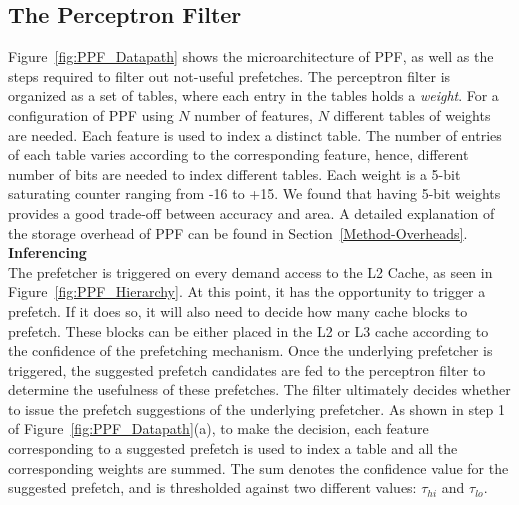 \subsection{The Perceptron Filter}
\label{Arch-Perceptron}

Figure~\ref{fig:PPF_Datapath} shows the microarchitecture of PPF, as
well as the steps required to filter out not-useful prefetches. The
perceptron filter is organized as a set of tables, where each entry in
the tables holds a \textit{weight}.  For a configuration of PPF using
$N$ number of features, $N$ different tables of weights are needed.
Each feature is used to index a distinct table. The number of entries
of each table varies according to the corresponding feature, hence,
different number of bits are needed to index different tables. Each
weight is a 5-bit saturating counter ranging from -16 to +15. We found
that having 5-bit weights provides a good trade-off between accuracy
and area. A detailed explanation of the storage overhead of PPF can
be found in Section~\ref{Method-Overheads}.
%
%
\newline
\newline
\noindent \textbf{Inferencing}\\
The {prefetcher} is triggered on every demand access to the L2
Cache, as seen in Figure~\ref{fig:PPF_Hierarchy}.  At this point, 
it has the opportunity to trigger a prefetch.
If it does so, it will also need to decide how many cache blocks to
prefetch.  These blocks can be either placed in the L2 or L3 cache
according to the confidence of the prefetching mechanism.  Once the
{underlying} prefetcher is triggered, the suggested prefetch candidates are
fed to the perceptron filter to determine the usefulness of these
prefetches. The filter ultimately decides whether to issue the
prefetch suggestions of the {underlying} prefetcher. As shown in step 1
of Figure~\ref{fig:PPF_Datapath}(a), to make the decision,
each feature corresponding to a suggested prefetch is used to index a
table and all the corresponding weights are summed. The sum denotes
the confidence value for the suggested prefetch, and is thresholded
against two different values: $\tau_{hi}$ and $\tau_{lo}$.

